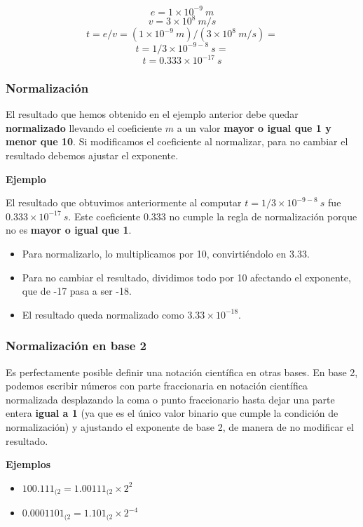 \documentclass[spanish,a4paper,]{article}
\providecommand{\tightlist}{%
  \setlength{\itemsep}{0pt}\setlength{\parskip}{0pt}}
\begin{document}
\[e = 1\times10^{-9}\ m\] \[v = 3\times10^{8}\ m/s\]
\[t = e / v = (1 \times 10^{-9}\ m) / (3 \times 10^8\ m/s) = \]
\[t = 1 / 3 \times 10^{-9-8}\ s =\] \[t = 0.333 \times 10^{-17}\ s\]

\hypertarget{normalizaciuxf3n}{%
\subsubsection{Normalización}\label{normalizaciuxf3n}}

El resultado que hemos obtenido en el ejemplo anterior debe quedar
\textbf{normalizado} llevando el coeficiente \(m\) a un valor
\textbf{mayor o igual que 1 y menor que 10}. Si modificamos el
coeficiente al normalizar, para no cambiar el resultado debemos ajustar
el exponente.

\textbf{Ejemplo}

El resultado que obtuvimos anteriormente al computar
\(t = 1 / 3 \times 10^{-9-8}\ s\) fue \(0.333 \times 10^{-17}\ s\). Este
coeficiente \(0.333\) no cumple la regla de normalización porque no es
\textbf{mayor o igual que 1}.

\begin{itemize}
\tightlist
\item
  Para normalizarlo, lo multiplicamos por 10, convirtiéndolo en
  \(3.33\).
\item
  Para no cambiar el resultado, dividimos todo por 10 afectando el
  exponente, que de -17 pasa a ser -18.
\item
  El resultado queda normalizado como \(3.33 \times 10^{-18}\).
\end{itemize}

\hypertarget{normalizaciuxf3n-en-base-2}{%
\subsubsection{Normalización en base
2}\label{normalizaciuxf3n-en-base-2}}

Es perfectamente posible definir una notación científica en otras bases.
En base 2, podemos escribir números con parte fraccionaria en notación
científica normalizada desplazando la coma o punto fraccionario hasta
dejar una parte entera \textbf{igual a 1} (ya que es el único valor
binario que cumple la condición de normalización) y ajustando el
exponente de base 2, de manera de no modificar el resultado.

\textbf{Ejemplos}

\begin{itemize}
\tightlist
\item
  \(100.111_{(2} = 1.00111_{(2} \times 2^2\)
\item
  \(0.0001101_{(2} = 1.101_{(2} \times 2^{-4}\)
\end{itemize}
\end{document}
